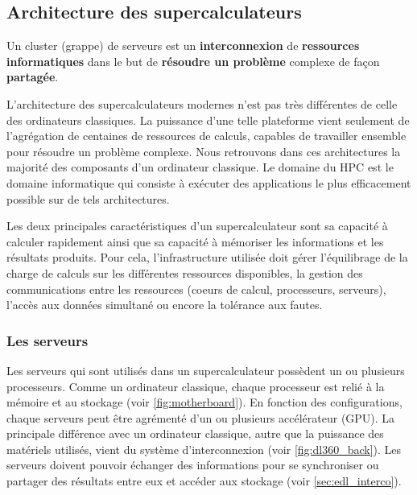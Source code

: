     

\subsection{Architecture des supercalculateurs}

\begin{fancyquotes}
Un cluster (grappe) de serveurs est un \textbf{interconnexion} de \textbf{ressources informatiques} dans le but de \textbf{résoudre un problème} complexe de façon \textbf{partagée}. 
\end{fancyquotes}

    L'architecture des supercalculateurs modernes n'est pas très différentes de celle des ordinateurs classiques. La puissance d'une telle plateforme vient seulement de l'agrégation de centaines de ressources de calculs, capables de travailler ensemble pour résoudre un problème complexe. Nous retrouvons dans ces architectures la majorité des composants d'un ordinateur classique. Le domaine du HPC est le domaine informatique qui consiste à exécuter des applications le plus efficacement possible sur de tels architectures. 
    
    Les deux principales caractéristiques d'un supercalculateur sont sa capacité à calculer rapidement ainsi que sa capacité à mémoriser les informations et les résultats produits. Pour cela, l'infrastructure utilisée doit gérer l'équilibrage de la charge de calculs sur les différentes ressources disponibles, la gestion des communications entre les ressources (coeurs de calcul, processeurs, serveurs), l'accès aux données simultané ou encore la tolérance aux fautes. 

    \subsubsection{Les serveurs}
        Les serveurs qui sont utilisés dans un supercalculateur possèdent un ou plusieurs processeurs. Comme un ordinateur classique, chaque processeur est relié à la mémoire et au stockage (voir \autoref{fig:motherboard}). En fonction des configurations, chaque serveurs peut être agrémenté d'un ou plusieurs accélérateur (GPU). La principale différence avec un ordinateur classique, autre que la puissance des matériels utilisés, vient du système d'interconnexion (voir \autoref{fig:dl360_back}). Les serveurs doivent pouvoir échanger des informations pour se synchroniser ou partager des résultats entre eux et accéder aux stockage (voir \autoref{sec:edl_interco}).
        
